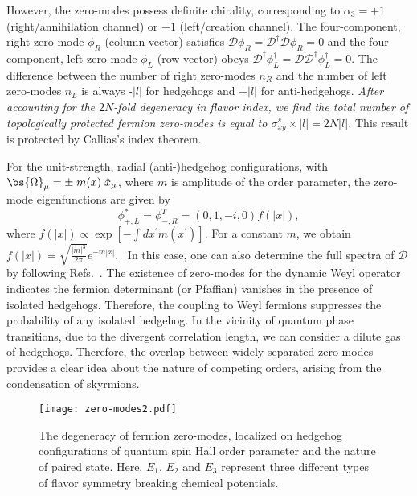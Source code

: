 \documentclass[aps,prb,amsmath,amssymb,floatfix,twocolumn]{revtex4}
\begin{document}
However, the zero-modes possess definite chirality, corresponding to  $\alpha_3= +1$ (right/annihilation channel) or $-1$ (left/creation channel). 
The four-component, right zero-mode $\phi_{R}$ (column vector) satisfies $\mathcal{D} \phi_R=\mathcal{D}^\dagger \mathcal{D} \phi_{R}=0$ and the four-component, left zero-mode $\phi_{L}$ (row vector) obeys $\mathcal{D}^\dagger \phi_L^\dagger=\mathcal{D} \mathcal{D}^\dagger\phi_L^\dagger=0$. The difference between the number of right zero-modes $n_R$ and the number of left zero-modes $n_L$ is always -$|l|$ for hedgehogs and +$|l|$ for anti-hedgehogs. \emph{After accounting for the $2N$-fold degeneracy in flavor index, we find the total number of topologically protected fermion zero-modes is equal to $\sigma^s_{xy} \times |l| = 2N |l|$.} This result is protected by Callias's index theorem.~\cite{JackiwRebbi1, Callias1, Callias2} 


For the unit-strength, radial (anti-)hedgehog configurations, with $\bs{\Omega}_\mu= \pm \; m(x) \; \hat{x}_\mu$, where $m$ is amplitude of the order parameter, the zero-mode eigenfunctions are given by
\begin{equation}
\phi^\ast_{+,L}=\phi_{-,R}^T=(0,1,-i,0)f(|x|),\label{eq7}
\end{equation}
where $f(|x|) \propto \exp[- \int dx^\prime m(x^\prime)]$. For a constant $m$, we obtain $f(|x|)=\sqrt{\frac{|m|^3}{2\pi}}e^{-m |x|}$.~\cite{GoswamiSi3} In this case, one can also determine the full spectra of $\mathcal{D}$ by following Refs.~.
The existence of zero-modes for the dynamic Weyl operator indicates the fermion determinant (or Pfaffian) vanishes in the presence of isolated hedgehogs. Therefore, the coupling to Weyl fermions suppresses the probability of any isolated hedgehog. In the vicinity of quantum phase transitions, due to the divergent correlation length, we can consider a dilute gas of hedgehogs. Therefore, the overlap between widely separated zero-modes provides a clear idea about the nature of competing orders, arising from the condensation of skyrmions. 


 \begin{figure}[t]
\centering
\texttt{[image: zero-modes2.pdf]}
\caption[]{The degeneracy of fermion zero-modes, localized on hedgehog configurations of quantum spin Hall order parameter and the nature of paired state. Here, $E_1$, $E_2$ and $E_3$ represent three different types of flavor symmetry breaking chemical potentials. } 
\label{Fig1}
\end{figure}
\end{document}
